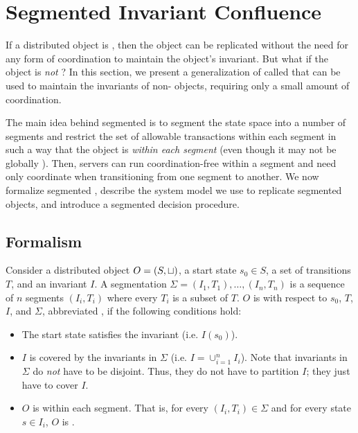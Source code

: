 \section{Segmented Invariant Confluence}
\newcommand{\IsIclosed}{\textsf{IsIclosed}}

If a distributed object is \invariantconfluent{}, then the object can be
replicated without the need for any form of coordination to maintain the
object's invariant. But what if the object is \emph{not} \invariantconfluent{}?
In this section, we present a generalization of \invariantconfluence{} called
 that can be used to maintain the
invariants of non-\invariantconfluent{} objects, requiring only a small amount of
coordination.

The main idea behind segmented \invariantconfluence{} is to segment the state
space into a number of segments and restrict the set of allowable transactions
within each segment in such a way that the object is \invariantconfluent{}
\emph{within each segment} (even though it may not be globally
\invariantconfluent{}). Then, servers can run coordination-free within a segment
and need only coordinate when transitioning from one segment to another. We now
formalize segmented \invariantconfluence{}, describe the system model we use to
replicate segmented \invariantconfluent{} objects, and introduce a segmented
\invariantconfluence{} decision procedure.

\subsection{Formalism}
Consider a distributed object $O = (S, \sqcup)$, a start state $s_0 \in S$, a
set of transitions $T$, and an invariant $I$. A segmentation $\Sigma = (I_1,
T_1), \ldots, (I_n, T_n)$ is a sequence of $n$ segments $(I_i, T_i)$ where
every $T_i$ is a subset of $T$. $O$ is 
with respect to $s_0$, $T$, $I$, and $\Sigma$, abbreviated
, if the following conditions hold:
\begin{itemize}
  \item
    The start state satisfies the invariant (i.e. $I(s_0)$).

  \item
    $I$ is covered by the invariants in $\Sigma$ (i.e. $I = \cup_{i=1}^n I_i$).
    Note that invariants in $\Sigma$ do \emph{not} have to be disjoint. Thus,
    they do not have to partition $I$; they just have to cover $I$.

  \item
    $O$ is \invariantconfluent{} within each segment. That is, for every $(I_i,
    T_i) \in \Sigma$ and for every state $s \in I_i$, $O$ is
    .
\end{itemize}

